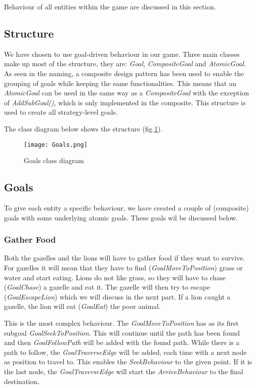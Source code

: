 Behaviour of all entities within the game are discussed in this section.

\subsection{Structure}\label{subsec:behaviourStructure}
We have chosen to use goal-driven behaviour in our game.
Three main classes make up most of the structure, they are: \textit{Goal}, \textit{CompositeGoal} and \textit{AtomicGoal}.
As seen in the naming, a composite design pattern has been used to enable the grouping of goals while keeping the same functionalities.
This means that an \textit{AtomicGoal} can be used in the same way as a \textit{CompositeGoal} with the exception of \textit{AddSubGoal()},
which is only implemented in the composite.
This structure is used to create all strategy-level goals.

The class diagram below shows the structure (fig.\ref{fig:behaviourClassDiagram}).

\begin{figure}[h!]
    \begin{center}
        \texttt{[image: Goals.png]}
    \end{center}
    \caption{Goals class diagram}
    \label{fig:behaviourClassDiagram}
\end{figure}


\subsection{Goals}\label{subsec:behaviourGoals}
To give each entity a specific behaviour, we have created a couple of (composite) goals with some underlying atomic goals.
These goals wil be discussed below.

\subsubsection{Gather Food}\label{sec:behaviourFood}
Both the gazelles and the lions will have to gather food if they want to survive.
For gazelles it will mean that they have to find (\textit{GoalMoveToPosition}) grass or water and start eating.
Lions do not like grass, so they will have to chase (\textit{GoalChase}) a gazelle and eat it.
The gazelle will then try to escape (\textit{GoalEscapeLion}) which we will discuss in the next part.
If a lion caught a gazelle, the lion will eat (\textit{GoalEat}) the poor animal.

This is the most complex behaviour.
The \textit{GoalMoveToPosition} has as its first subgoal \textit{GoalSeekToPosition}.
This will continue until the path has been found and then \textit{GoalFollowPath} will be added with the found path.
While there is a path to follow, the \textit{GoalTraverseEdge} will be added, each time with a next node as position to travel to.
This enables the \textit{SeekBehaviour} to the given point.
If it is the last node, the \textit{GoalTraverseEdge} will start the \textit{ArriveBehaviour} to the final destination.

